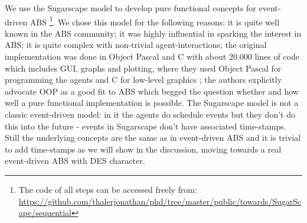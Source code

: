 We use the Sugarscape model to develop pure functional concepts for event-driven ABS \footnote{The code of all steps can be accessed freely from: \url{https://github.com/thalerjonathan/phd/tree/master/public/towards/SugarScape/sequential}}. We chose this model for the following reasons: it is quite well known in the ABS community; it was highly influential in sparking the interest in ABS; it is quite complex with non-trivial agent-interactions; the original implementation was done in Object Pascal and C with about 20.000 lines of code which includes GUI, graphs and plotting, where they used Object Pascal for programming the agents and C for low-level graphics \cite{axtell_aligning_1996}; the authors explicitly advocate OOP as a good fit to ABS which begged the question whether and how well a pure functional implementation is possible. The Sugarscape model is not a classic event-driven model: in it the agents do schedule events but they don't do this into the future - events in Sugarscape don't have associated time-stamps. Still the underlying concepts are the same as in event-driven ABS and it is trivial to add time-stamps as we will show in the discussion, moving towards a real event-driven ABS with DES character.





